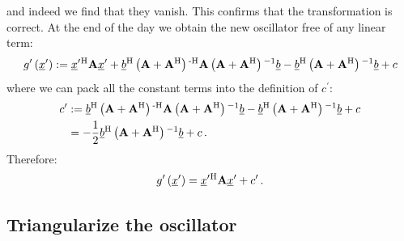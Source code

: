 \documentclass[a4paper,10pt]{article}
\begin{document}
and indeed we find that they vanish. This confirms that the
transformation is correct. At the end of the day we obtain the
new oscillator free of any linear term:
\begin{equation}
  g^{\prime}\left(\underline{x}^{\prime}\right) :=
  \underline{x}^{\prime}{}^{\textnormal{H}} \mathbf{A} \underline{x}^{\prime}
  + \underline{b}{}^{\textnormal{H}} \left(\mathbf{A} + \mathbf{A}{}^{\textnormal{H}}\right){}^{\textnormal{-H}} \mathbf{A} \left(\mathbf{A} + \mathbf{A}{}^{\textnormal{H}}\right){}^{-1} \underline{b}
  - \underline{b}{}^{\textnormal{H}} \left(\mathbf{A} + \mathbf{A}{}^{\textnormal{H}}\right){}^{-1} \underline{b}
  + c
\end{equation}
where we can pack all the constant terms into the definition of $c^{\prime}$:
\begin{equation}
\begin{split}
  c^{\prime} & :=
               \underline{b}{}^{\textnormal{H}} \left(\mathbf{A} + \mathbf{A}{}^{\textnormal{H}}\right){}^{\textnormal{-H}} \mathbf{A} \left(\mathbf{A} + \mathbf{A}{}^{\textnormal{H}}\right){}^{-1} \underline{b}
             - \underline{b}{}^{\textnormal{H}} \left(\mathbf{A} + \mathbf{A}{}^{\textnormal{H}}\right){}^{-1} \underline{b}
             + c \\
             & =
             -\frac{1}{2} \underline{b}{}^{\textnormal{H}} \left(\mathbf{A} + \mathbf{A}{}^{\textnormal{H}}\right){}^{-1} \underline{b} + c \,.
\end{split}
\end{equation}
Therefore:
\begin{equation}\label{eq:linearless_operator}
  g^{\prime}\left(\underline{x}^{\prime}\right) = \underline{x}^{\prime}{}^{\textnormal{H}} \mathbf{A} \underline{x}^{\prime}
                                            + c^{\prime} \,.
\end{equation}


\subsection{Triangularize the oscillator}
\end{document}
